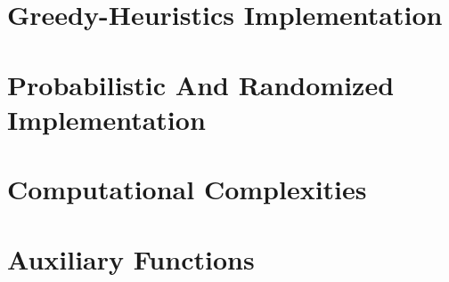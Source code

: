 \documentclass[longpaper, english, final, times]{revdetua}
\begin{document}
	\section{Greedy-Heuristics Implementation}
	
	\section{Probabilistic And Randomized Implementation}
	
	\section{Computational Complexities}
	
	\section{Auxiliary Functions}
	
		
	
\end{document}
